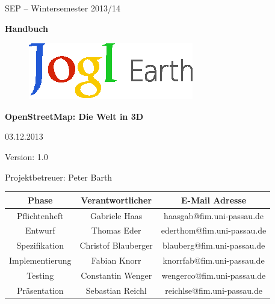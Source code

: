 \documentclass[10pt]{scrreprt}
\begin{document}
\begin{center}
\vspace{2.0 cm}
{\LARGE SEP – Wintersemester 2013/14}

\vspace{1.0 cm}
\textbf{{\Huge Handbuch}}

\vspace{0.4 cm}
\begin{figure}[!htb]
\begin{center}
	\includegraphics[scale=1.5]{Logo-Print.eps}
\end{center}
\end{figure}

\vspace{0.2 cm}
\textbf{{\huge OpenStreetMap: Die Welt in 3D}}

\vspace{1.5 cm}
03.12.2013

\vspace{0.5 cm}
Version: 1.0

\vspace{1.5 cm}
{\Large Projektbetreuer: Peter Barth}

\vspace{1.5 cm}
\begin{tabular}{|c|c|c|}
\hline 
\rule[-1ex]{0pt}{4ex} \textbf{Phase} & \textbf{Verantwortlicher} & \textbf{E-Mail Adresse} \\ 
\hline  \hline
\rule[-1ex]{0pt}{4ex} Pflichtenheft & Gabriele Haas & haasgab@fim.uni-passau.de \\ 
\hline  \hline
\rule[-1ex]{0pt}{4ex} Entwurf & Thomas Eder & ederthom@fim.uni-passau.de \\ 
\hline  \hline
\rule[-1ex]{0pt}{4ex} Spezifikation & Christof Blauberger & blauberg@fim.uni-passau.de \\ 
\hline  \hline
\rule[-1ex]{0pt}{4ex} Implementierung & Fabian Knorr & knorrfab@fim.uni-passau.de \\ 
\hline \hline 
\rule[-1ex]{0pt}{4ex} Testing & Constantin Wenger & wengerco@fim.uni-passau.de \\ 
\hline  \hline
\rule[-1ex]{0pt}{4ex} Präsentation & Sebastian Reichl & reichlse@fim.uni-passau.de \\ 
\hline 
\end{tabular}

\end{center}
\end{document}
